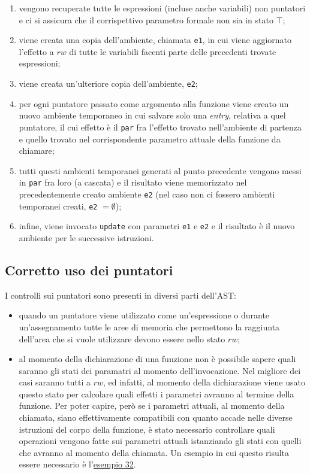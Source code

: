 \documentclass[../report.tex]{subfiles}
\begin{document}
\begin{enumerate}
    \item vengono recuperate tutte le espressioni (incluse anche variabili) non puntatori e ci si assicura che il corrispettivo parametro formale non sia in stato $\top$;
    \item viene creata una copia dell'ambiente, chiamata \verb|e1|, in cui viene aggiornato l'effetto a $rw$ di tutte le variabili facenti parte delle precedenti trovate espressioni;
    \item viene creata un'ulteriore copia dell'ambiente, \verb|e2|;
    \item per ogni puntatore passato come argomento alla funzione viene creato un nuovo ambiente temporaneo in cui salvare solo una \textit{entry}, relativa a quel puntatore, il cui effetto è il \verb|par| fra l'effetto trovato nell'ambiente di partenza e quello trovato nel corrispondente parametro attuale della funzione da chiamare;
    \item tutti questi ambienti temporanei generati al punto precedente vengono messi in \verb|par| fra loro (a cascata) e il risultato viene memorizzato nel precedentemente creato ambiente \verb|e2| (nel caso non ci fossero ambienti temporanei creati, \verb|e2| $= \emptyset{}$);
    \item infine, viene invocato \verb|update| con parametri \verb|e1| e \verb|e2| e il risultato è il nuovo ambiente per le successive istruzioni.
\end{enumerate}

\subsection{Corretto uso dei puntatori}\label{s:corretto_uso_dei_puntatori}
I controlli sui puntatori sono presenti in diversi parti dell'AST:
\begin{itemize}
    \item quando un puntatore viene utilizzato come un'espressione o durante un'assegnamento tutte le aree di memoria che permettono la raggiunta dell'area che si vuole utilizzare devono essere nello stato $rw$;
    \item al momento della dichiarazione di una funzione non \`e possibile sapere quali saranno gli stati dei paramatri al momento dell'invocazione. Nel migliore dei casi saranno tutti a $rw$, ed infatti, al momento della dichiarazione viene usato questo stato per calcolare quali effetti i parametri avranno al termine della funzione. Per poter capire, per\`o se i parametri attuali, al momento della chiamata, siano effettivamente compatibili con quanto accade nelle diverse istruzioni del corpo della funzione, \`e stato necessario controllare quali operazioni vengono fatte sui parametri attuali istanziando gli stati con quelli che avranno al momento della chiamata. Un esempio in cui questo risulta essere necessario \`e l'\hyperref[s:esempio32]{esempio 32}.
\end{itemize}
\end{document}
